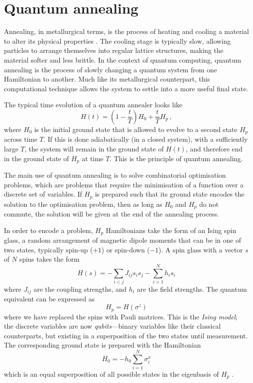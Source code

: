 \documentclass[12pt]{article}
\begin{document}
\section{Quantum annealing}

Annealing, in metallurgical terms, is the process of heating and cooling a material to alter its physical properties . The cooling stage is typically slow, allowing particles to arrange themselves into regular lattice structures, making the material softer and less brittle. In the context of quantum computing, quantum annealing is the process of slowly changing a quantum system from one Hamiltonian to another. Much like its metallurgical counterpart, this computational technique allows the system to settle into a more useful final state.

The typical time evolution of a quantum annealer looks like
\begin{equation}
    H(t)=\left(1- \frac{t}{T}\right)H_0 + \frac{t}{T}H_p \,,
    \label{eq:time-evolution}
\end{equation}
where $H_0$ is the initial ground state that is allowed to evolve to a second state $H_p$ across time $T$. If this is done adiabatically (in a closed system), with a sufficiently large $T$, the system will remain in the ground state of $H(t)$, and therefore end in the ground state of $H_p$ at time $T$. This is the principle of quantum annealing.

The main use of quantum annealing is to solve combinatorial optimisation problems, which are problems that require the minimisation of a function over a discrete set of variables. If $H_p$ is prepared such that its ground state encodes the solution to the optimisation problem, then as long as $H_0$ and $H_p$ do not commute, the solution will be given at the end of the annealing process.

In order to encode a problem, $H_p$ Hamiltonians take the form of an Ising spin glass, a random arrangement of magnetic dipole moments that can be in one of two states, typically spin-up ($+1$) or spin-down ($-1$). A spin glass with a vector $s$ of $N$ spins takes the form
\begin{equation}
    H(s) = -\sum_{i<j}J_{ij}s_i s_j - \sum_{i=1}^{N}h_i s_i
    \label{eq:ising}
\end{equation}
where $J_{ij}$ are the coupling strengths, and $h_i$ are the field strengths. The quantum equivalent can be expressed as
\begin{equation}
    H_p = H(\sigma^z)
\end{equation}
where we have replaced the spins with Pauli matrices. This is the \textit{Ising model}; the discrete variables are now \textit{qubits}—binary variables like their classical counterparts, but existing in a superposition of the two states until measurement. The corresponding ground state is prepared with the Hamiltonian 
\begin{equation}
    H_0 = -h_0\sum_{i=1}^{N}\sigma_i^x
\end{equation}
which is an equal superposition of all possible states in the eigenbasis of $H_p$ .
\end{document}
